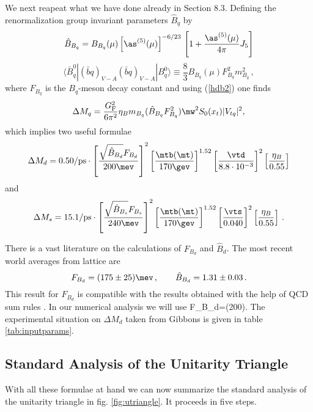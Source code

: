 We next reapeat what we have done already in Section 8.3.
Defining the renormalization group invariant parameters $\hat B_q$
by
\begin{equation}\label{Def-Bpar1}
\hat B_{B_q} = B_{B_q}(\mu) \left[ \as^{(5)}(\mu) \right]^{-6/23} \,
\left[ 1 + \frac{\as^{(5)}(\mu)}{4\pi} J_5 \right]
\label{eq:BBrenorm}
\end{equation}
\begin{equation}
\langle \bar B^0_q| (\bar b q)_{V-A} (\bar b q)_{V-A} |B^0_q\rangle
\equiv \frac{8}{3} B_{B_q}(\mu) F_{B_q}^2 m_{B_q}^2\,,
\label{eq:BbarB}
\end{equation}
where
$F_{B_q}$ is the $B_q$-meson decay constant
and using (\ref{hdb2}) one finds
\begin{equation}
\Delta M_q = \frac{G_{\rm F}^2}{6 \pi^2} \eta_B m_{B_q} 
(\hat B_{B_q} F_{B_q}^2 ) \mw^2 S_0(x_t) |V_{tq}|^2,
\label{eq:xds}
\end{equation}
which implies two useful formulae
\begin{equation}\label{DMD}
\Delta M_d=
0.50/{\rm ps}\cdot\left[ 
\frac{\sqrt{\hat B_{B_d}}F_{B_d}}{200\mev}\right]^2
\left[\frac{\mtb(\mt)}{170\gev}\right]^{1.52} 
\left[\frac{\vtd}{8.8\cdot10^{-3}} \right]^2 
\left[\frac{\eta_B}{0.55}\right]  
\end{equation}
and
\begin{equation}\label{DMS}
\Delta M_{s}=
15.1/{\rm ps}\cdot\left[ 
\frac{\sqrt{\hat B_{B_s}}F_{B_s}}{240\mev}\right]^2
\left[\frac{\mtb(\mt)}{170\gev}\right]^{1.52} 
\left[\frac{\vts}{0.040} \right]^2
\left[\frac{\eta_B}{0.55}\right] \,.
\end{equation}

There is a vast literature on the calculations of $F_{B_d}$ and
$\hat B_d$.
The most recent world averages from lattice are \cite{Flynn,Bernard}
\begin{equation}
F_{B_d}=(175\pm 25)\mev\,, \qquad
\hat B_{B_d}=1.31\pm 0.03\,.
\end{equation}
This result for $F_{B_d}$ is compatible with the results obtained 
with the help of QCD sum rules   \cite{QCDSF}.
In our numerical analysis we will use
\be
F_{B_d}=(200)\mev.
\ee
The experimental situation on
$\Delta M_d$ taken from Gibbons \cite{Gibbons}
 is given in table \ref{tab:inputparams}. 
\subsection{Standard Analysis of the Unitarity Triangle}\label{UT-Det}
With all these formulae at hand we can now summarize the standard
analysis of the unitarity triangle in fig. \ref{fig:utriangle}. 
It proceeds in five steps.

